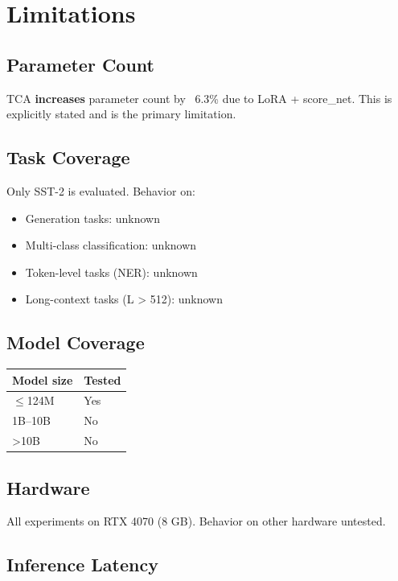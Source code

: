 \section{Limitations}

\subsection{Parameter Count}

TCA \textbf{increases} parameter count by ~6.3\% due to LoRA + score\_net. This is 
explicitly stated and is the primary limitation.

\subsection{Task Coverage}

Only SST-2 is evaluated. Behavior on:
\begin{itemize}
\item Generation tasks: unknown
\item Multi-class classification: unknown
\item Token-level tasks (NER): unknown
\item Long-context tasks (L \textgreater{} 512): unknown

\end{itemize}
\subsection{Model Coverage}

\begin{table}[H]
\centering
\small
\begin{tabular}{ll}
\toprule
\textbf{Model size} & \textbf{Tested} \\
\midrule
$\le$124M & Yes \\
1B--10B & No \\
\textgreater{}10B & No \\
\bottomrule
\end{tabular}
\end{table}

\subsection{Hardware}

All experiments on RTX 4070 (8 GB). Behavior on other hardware untested.

\subsection{Inference Latency}


